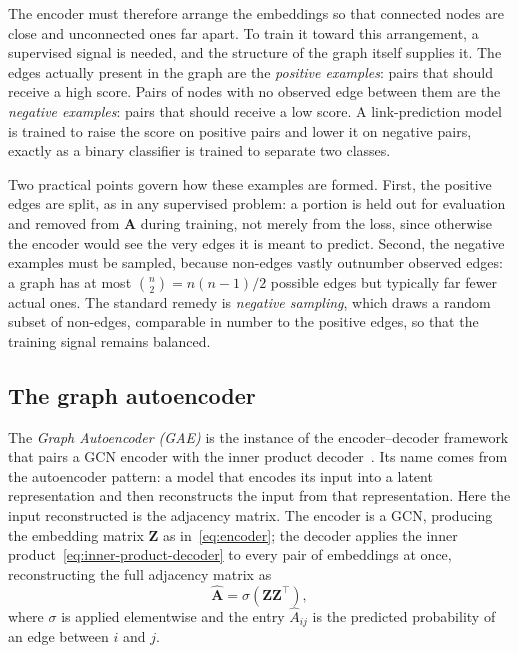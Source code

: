 The encoder must therefore arrange the embeddings so that connected nodes are close and 
unconnected ones far apart. To train it toward this arrangement, a supervised signal is needed, 
and the structure of the graph itself supplies it. The edges actually present in the graph are the
\textit{positive examples}: pairs that should receive a high score. Pairs of nodes
with no observed edge between them are the \textit{negative examples}: pairs that should
receive a low score. A link-prediction model is trained to raise the score on
positive pairs and lower it on negative pairs, exactly as a binary classifier is
trained to separate two classes.

Two practical points govern how these examples are formed. First, the positive edges are split, 
as in any supervised problem: a portion is held out for evaluation and removed from $\mathbf{A}$ 
during training, not merely from the loss, since otherwise the encoder would see the very edges it is
meant to predict. Second, the negative examples must be sampled, because non-edges vastly outnumber 
observed edges: a graph has at most $\binom{n}{2}=n(n-1)/2$ possible edges but typically 
far fewer actual ones. The standard remedy is \textit{negative sampling}, which draws a random subset 
of non-edges, comparable in number to the positive edges, so that the training signal remains balanced.

\subsection{The graph autoencoder}
\label{sec:gae}

The \textit{Graph Autoencoder (GAE)} is the instance of the encoder--decoder framework that
pairs a GCN encoder with the inner product decoder~\cite{kipf2016}. Its name comes
from the autoencoder pattern: a model that encodes its input into a latent
representation and then reconstructs the input from that representation. Here the
input reconstructed is the adjacency matrix. The encoder is a GCN, producing the
embedding matrix $\mathbf{Z}$ as in~\eqref{eq:encoder}; the decoder applies the
inner product~\eqref{eq:inner-product-decoder} to every pair of embeddings at once,
reconstructing the full adjacency matrix as
\begin{equation}
  \hat{\mathbf{A}} = \sigma\!\left( \mathbf{Z} \mathbf{Z}^\top \right),
  \label{eq:gae-reconstruction}
\end{equation}
where $\sigma$ is applied elementwise and the entry $\hat{A}_{ij}$ is the predicted
probability of an edge between $i$ and $j$.

